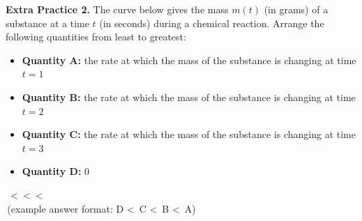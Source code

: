 \documentclass[10pt]{article}
\begin{document}
{\bf\color{blue}Extra Practice 2.}\reversemarginpar{} The curve below gives the mass $m(t)$ (in grams) of a substance at a time $t$ (in seconds) during a chemical reaction. Arrange the following quantities from least to greatest:
\begin{itemize}
\item {\bf Quantity A:} the rate at which the mass of the substance is changing at time $t=1$
\item {\bf Quantity B:} the rate at which the mass of the substance is changing at time $t=2$
\item {\bf Quantity C:} the rate at which the mass of the substance is changing at time $t=3$
\item {\bf Quantity D:} $0$
\end{itemize}

\begin{center}
\begin{minipage}{0.45\textwidth}
\begin{center}
\end{center}
\end{minipage}
%
\quad
%
\begin{minipage}{0.45\textwidth}
\,\hfill
{\Large {}\textless\, \textless\,  \textless\, }\hfill\,\\

\,\hfill{\scriptsize (example answer format: D \textless\, C \textless\, B \textless\, A) }\hfill\,
\end{minipage}
\end{center}
\end{document}
